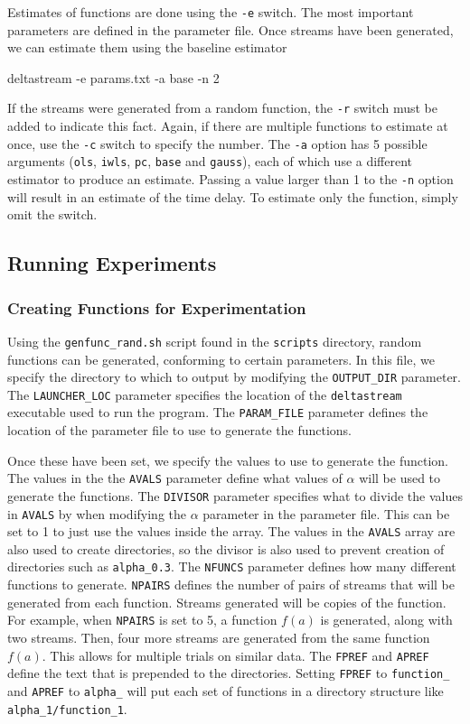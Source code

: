 \documentclass[a4paper,11pt]{article}
\begin{document}
\begin{appendices}
    Estimates of functions are done using the \texttt{-e} switch. The most
    important parameters are defined in the parameter file. Once streams have
    been generated, we can estimate them using the baseline estimator
\begin{verbatimtab}
deltastream -e params.txt -a base -n 2
\end{verbatimtab}
    If the streams were generated from a random function, the \texttt{-r} switch
    must be added to indicate this fact. Again, if there are multiple functions
    to estimate at once, use the \texttt{-c} switch to specify the number. The
    \texttt{-a} option has 5 possible arguments (\texttt{ols}, \texttt{iwls},
    \texttt{pc}, \texttt{base} and \texttt{gauss}), each of which use a
    different estimator to produce an estimate. Passing a value larger than 1 to
    the \texttt{-n} option will result in an estimate of the time delay. To
    estimate only the function, simply omit the switch.
\subsection{Running Experiments}
\label{sec-10-3}
\subsubsection{Creating Functions for Experimentation}
\label{sec-10-3-1}

Using the \texttt{genfunc\_rand.sh} script found in the \texttt{scripts} directory, random
functions can be generated, conforming to certain parameters. In this file,
we specify the directory to which to output by modifying the
\texttt{OUTPUT\_DIR} parameter. The \texttt{LAUNCHER\_LOC} parameter specifies the
location of the \texttt{deltastream} executable used to run the program. The
\texttt{PARAM\_FILE} parameter defines the location of the parameter file to use
to generate the functions.

Once these have been set, we specify the values to use to generate the
function. The values in the the \texttt{AVALS} parameter define what values of
$\alpha$ will be used to generate the functions. The \texttt{DIVISOR} parameter
specifies what to divide the values in \texttt{AVALS} by when modifying the
$\alpha$ parameter in the parameter file. This can be set to 1 to just use the
values inside the array. The values in the \texttt{AVALS} array are also used to
create directories, so the divisor is also used to prevent creation of
directories such as \texttt{alpha\_0.3}. The \texttt{NFUNCS} parameter defines
how many different functions to generate. \texttt{NPAIRS} defines the number of
pairs of streams that will be generated from each function. Streams generated
will be copies of the function. For example, when \texttt{NPAIRS} is set to 5, a
function $f(a)$ is generated, along with two streams. Then, four more streams
are generated from the same function $f(a)$. This allows for multiple trials on
similar data. The \texttt{FPREF} and \texttt{APREF} define the text that is
prepended to the directories. Setting \texttt{FPREF} to \texttt{function\_} and
\texttt{APREF} to \texttt{alpha\_} will put each set of functions in a directory
structure like \texttt{alpha\_1/function\_1}.

\end{appendices}
\end{document}
